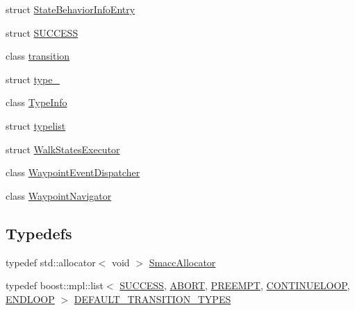 \begin{DoxyCompactItemize}
\item 
struct \hyperlink{structsmacc_1_1StateBehaviorInfoEntry}{State\+Behavior\+Info\+Entry}
\item 
struct \hyperlink{structsmacc_1_1SUCCESS}{S\+U\+C\+C\+E\+SS}
\item 
class \hyperlink{classsmacc_1_1transition}{transition}
\item 
struct \hyperlink{structsmacc_1_1type__}{type\+\_\+}
\item 
class \hyperlink{classsmacc_1_1TypeInfo}{Type\+Info}
\item 
struct \hyperlink{structsmacc_1_1typelist}{typelist}
\item 
struct \hyperlink{structsmacc_1_1WalkStatesExecutor}{Walk\+States\+Executor}
\item 
class \hyperlink{classsmacc_1_1WaypointEventDispatcher}{Waypoint\+Event\+Dispatcher}
\item 
class \hyperlink{classsmacc_1_1WaypointNavigator}{Waypoint\+Navigator}
\end{DoxyCompactItemize}
\subsection*{Typedefs}
\begin{DoxyCompactItemize}
\item 
typedef std\+::allocator$<$ void $>$ \hyperlink{namespacesmacc_ac43548af6721e408234339fcf1ab1254}{Smacc\+Allocator}
\item 
typedef boost\+::mpl\+::list$<$ \hyperlink{structsmacc_1_1SUCCESS}{S\+U\+C\+C\+E\+SS}, \hyperlink{structsmacc_1_1ABORT}{A\+B\+O\+RT}, \hyperlink{structsmacc_1_1PREEMPT}{P\+R\+E\+E\+M\+PT}, \hyperlink{structsmacc_1_1CONTINUELOOP}{C\+O\+N\+T\+I\+N\+U\+E\+L\+O\+OP}, \hyperlink{structsmacc_1_1ENDLOOP}{E\+N\+D\+L\+O\+OP} $>$ \hyperlink{namespacesmacc_a5238572f5e2747391ba919540aaf70bd}{D\+E\+F\+A\+U\+L\+T\+\_\+\+T\+R\+A\+N\+S\+I\+T\+I\+O\+N\+\_\+\+T\+Y\+P\+ES}
\end{DoxyCompactItemize}
